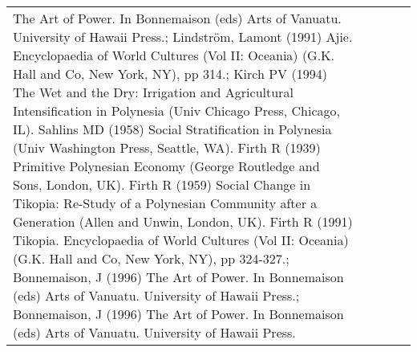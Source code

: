 \begin{longtable}{p{1.8cm}p{1.8cm}p{1.8cm}p{2cm}p{7cm}}
The Art of Power. In Bonnemaison (eds) Arts of Vanuatu. University of Hawaii Press.; Lindström, Lamont (1991) Ajie. Encyclopaedia of World Cultures (Vol II: Oceania) (G.K. Hall and Co, New York, NY), pp 314.; Kirch PV (1994) The Wet and the Dry: Irrigation and Agricultural Intensification in Polynesia (Univ Chicago Press, Chicago, IL). Sahlins MD (1958) Social Stratification in Polynesia (Univ Washington Press, Seattle, WA). Firth R (1939) Primitive Polynesian Economy (George Routledge and Sons, London, UK). Firth R (1959) Social Change in Tikopia: Re-Study of a Polynesian Community after a Generation (Allen and Unwin, London, UK). Firth R (1991) Tikopia. Encyclopaedia of World Cultures (Vol II: Oceania) (G.K. Hall and Co, New York, NY), pp 324-327.; Bonnemaison, J (1996) The Art of Power. In Bonnemaison (eds) Arts of Vanuatu. University of Hawaii Press.; Bonnemaison, J (1996) The Art of Power. In Bonnemaison (eds) Arts of Vanuatu. University of Hawaii Press. \\ 

\end{longtable}
